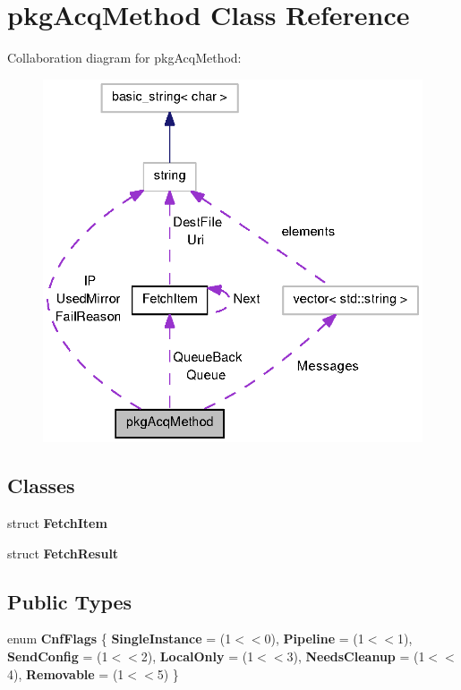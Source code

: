 \section{pkg\-Acq\-Method \-Class \-Reference}
\label{classpkgAcqMethod}


\-Collaboration diagram for pkg\-Acq\-Method\-:
\nopagebreak
\begin{figure}[H]
\begin{center}
\leavevmode
\includegraphics[width=335pt]{classpkgAcqMethod__coll__graph}
\end{center}
\end{figure}
\subsection*{\-Classes}
\begin{DoxyCompactItemize}
\item 
struct {\bf \-Fetch\-Item}
\item 
struct {\bf \-Fetch\-Result}
\end{DoxyCompactItemize}
\subsection*{\-Public \-Types}
\begin{DoxyCompactItemize}
\item 
enum {\bfseries \-Cnf\-Flags} \{ \*
{\bfseries \-Single\-Instance} =  (1$<$$<$0), 
{\bfseries \-Pipeline} =  (1$<$$<$1), 
{\bfseries \-Send\-Config} =  (1$<$$<$2), 
{\bfseries \-Local\-Only} =  (1$<$$<$3), 
\*
{\bfseries \-Needs\-Cleanup} =  (1$<$$<$4), 
{\bfseries \-Removable} =  (1$<$$<$5)
 \}
\end{DoxyCompactItemize}
